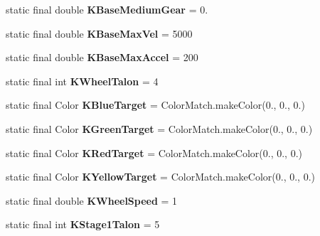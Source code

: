 \begin{DoxyCompactItemize}
static final double {\bfseries K\+Base\+Medium\+Gear} = 0.
\item 
\mbox{\label{classfrc_1_1robot_1_1_constants_a82f1934b756af17eb22e5003625eb89d}} 
static final double {\bfseries K\+Base\+Max\+Vel} = 5000
\item 
\mbox{\label{classfrc_1_1robot_1_1_constants_a0e97cd61756f5c960c4a76147c9d8cc2}} 
static final double {\bfseries K\+Base\+Max\+Accel} = 200
\item 
\mbox{\label{classfrc_1_1robot_1_1_constants_ad27ac24527796530cf4ee9f7e1116d20}} 
static final int {\bfseries K\+Wheel\+Talon} = 4
\item 
\mbox{\label{classfrc_1_1robot_1_1_constants_a90df8876cbd8aadc4ca8838aae8970eb}} 
static final Color {\bfseries K\+Blue\+Target} = Color\+Match.\+make\+Color(0., 0., 0.)
\item 
\mbox{\label{classfrc_1_1robot_1_1_constants_a473f44a9b08d728a76de63821e2a5c13}} 
static final Color {\bfseries K\+Green\+Target} = Color\+Match.\+make\+Color(0., 0., 0.)
\item 
\mbox{\label{classfrc_1_1robot_1_1_constants_a2173fba4dd429db80d3791f6965c2848}} 
static final Color {\bfseries K\+Red\+Target} = Color\+Match.\+make\+Color(0., 0., 0.)
\item 
\mbox{\label{classfrc_1_1robot_1_1_constants_a8467aed4f3441ef36b2b12664fe90cad}} 
static final Color {\bfseries K\+Yellow\+Target} = Color\+Match.\+make\+Color(0., 0., 0.)
\item 
\mbox{\label{classfrc_1_1robot_1_1_constants_a2dd80fc1e8a5e4d57fb38c8c0a6d68bc}} 
static final double {\bfseries K\+Wheel\+Speed} = 1
\item 
\mbox{\label{classfrc_1_1robot_1_1_constants_add806bfc7558bc4b981a46e9d3162e1c}} 
static final int {\bfseries K\+Stage1\+Talon} = 5

\end{DoxyCompactItemize}
